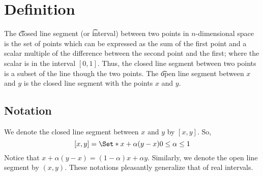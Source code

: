 
\section*{Definition}

The \t{closed line segment} (or \t{interval}) between two points in $n$-dimensional space is the set of points which can be expressed as the sum of the first point and a scalar multiple of the difference between the second point and the first; where the scalar is in the interval $[0, 1]$.
Thus, the closed line segment between two points is a subset of the line though the two points.
The \t{open line segment} between $x$ and $y$ is the closed line segment with the points $x$ and $y$.

\subsection*{Notation}

We denote the closed line segment between $x$ and $y$ by $[x, y]$.
So,
\[
[x,y] = \Set*{x + \alpha (y-x)}{0 \leq \alpha  \leq 1}
\]
Notice that $x + \alpha (y - x) = (1-\alpha )x + \alpha y$.
Similarly, we denote the open line segment by $(x, y)$.
These notations pleasantly generalize that of real intervals.

\blankpage